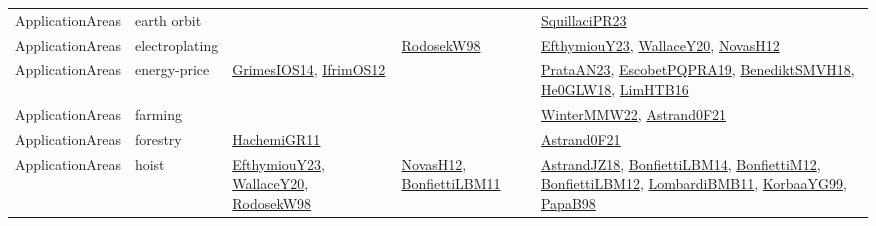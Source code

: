 {\begin{longtable}{lp{3cm}>{\raggedright}p{6cm}>{\raggedright}p{6cm}p{8cm}}
ApplicationAreas & earth orbit &  &  & \href{papers/SquillaciPR23.pdf}{SquillaciPR23}\cite{SquillaciPR23}\\
ApplicationAreas & electroplating &  & \href{papers/RodosekW98.pdf}{RodosekW98}\cite{RodosekW98} & \href{papers/EfthymiouY23.pdf}{EfthymiouY23}\cite{EfthymiouY23}, \href{articles/WallaceY20.pdf}{WallaceY20}\cite{WallaceY20}, \href{articles/NovasH12.pdf}{NovasH12}\cite{NovasH12}\\
ApplicationAreas & energy-price & \href{articles/GrimesIOS14.pdf}{GrimesIOS14}\cite{GrimesIOS14}, \href{papers/IfrimOS12.pdf}{IfrimOS12}\cite{IfrimOS12} &  & \href{articles/PrataAN23.pdf}{PrataAN23}\cite{PrataAN23}, \href{articles/EscobetPQPRA19.pdf}{EscobetPQPRA19}\cite{EscobetPQPRA19}, \href{papers/BenediktSMVH18.pdf}{BenediktSMVH18}\cite{BenediktSMVH18}, \href{papers/He0GLW18.pdf}{He0GLW18}\cite{He0GLW18}, \href{papers/LimHTB16.pdf}{LimHTB16}\cite{LimHTB16}\\
ApplicationAreas & farming &  &  & \href{papers/WinterMMW22.pdf}{WinterMMW22}\cite{WinterMMW22}, \href{papers/Astrand0F21.pdf}{Astrand0F21}\cite{Astrand0F21}\\
ApplicationAreas & forestry & \href{articles/HachemiGR11.pdf}{HachemiGR11}\cite{HachemiGR11} &  & \href{papers/Astrand0F21.pdf}{Astrand0F21}\cite{Astrand0F21}\\
ApplicationAreas & hoist & \href{papers/EfthymiouY23.pdf}{EfthymiouY23}\cite{EfthymiouY23}, \href{articles/WallaceY20.pdf}{WallaceY20}\cite{WallaceY20}, \href{papers/RodosekW98.pdf}{RodosekW98}\cite{RodosekW98} & \href{articles/NovasH12.pdf}{NovasH12}\cite{NovasH12}, \href{papers/BonfiettiLBM11.pdf}{BonfiettiLBM11}\cite{BonfiettiLBM11} & \href{papers/AstrandJZ18.pdf}{AstrandJZ18}\cite{AstrandJZ18}, \href{articles/BonfiettiLBM14.pdf}{BonfiettiLBM14}\cite{BonfiettiLBM14}, \href{papers/BonfiettiM12.pdf}{BonfiettiM12}\cite{BonfiettiM12}, \href{papers/BonfiettiLBM12.pdf}{BonfiettiLBM12}\cite{BonfiettiLBM12}, \href{papers/LombardiBMB11.pdf}{LombardiBMB11}\cite{LombardiBMB11}, \href{papers/KorbaaYG99.pdf}{KorbaaYG99}\cite{KorbaaYG99}, \href{articles/PapaB98.pdf}{PapaB98}\cite{PapaB98}\\

\end{longtable}}
